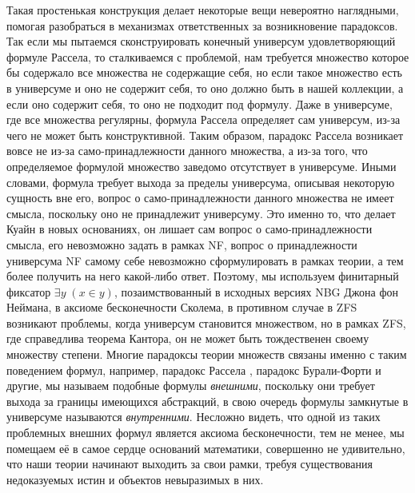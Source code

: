 \documentclass[12pt]{article}
\begin{document}
Такая простенькая конструкция делает некоторые вещи невероятно наглядными, помогая разобраться в механизмах ответственных за возникновение парадоксов. Так если мы пытаемся сконструировать конечный универсум удовлетворяющий формуле Рассела, то сталкиваемся с проблемой, нам требуется множество которое бы содержало все множества не содержащие себя, но если такое множество есть в универсуме и оно не содержит себя, то оно должно быть в нашей коллекции, а если оно содержит себя, то оно не подходит под формулу. Даже в универсуме, где все множества регулярны, формула Рассела определяет сам универсум, из-за чего не может быть конструктивной. Таким образом, парадокс Рассела возникает вовсе не из-за само-принадлежности данного множества, а из-за того, что определяемое формулой множество заведомо отсутствует в универсуме. Иными словами, формула требует выхода за пределы универсума, описывая некоторую сущность вне его, вопрос о само-принадлежности данного множества не имеет смысла, поскольку оно не принадлежит универсуму. Это именно то, что делает Куайн в новых основаниях, он лишает сам вопрос о само-принадлежности смысла, его невозможно задать в рамках NF, вопрос о принадлежности универсума NF самому себе невозможно сформулировать в рамках теории, а тем более получить на него какой-либо ответ. Поэтому, мы используем финитарный фиксатор $\exists y \; (x \in y)$, позаимствованный в исходных версиях NBG Джона фон Неймана, в аксиоме бесконечности Сколема, в противном случае в ZFS возникают проблемы, когда универсум становится множеством, но в рамках ZFS, где справедлива теорема Кантора, он не может быть тождественен своему множеству степени. Многие парадоксы теории множеств связаны именно с таким поведением формул, например, парадокс Рассела \cite{russell-paradox}, парадокс Бурали-Форти \cite{burali-forti} и другие, мы называем подобные формулы {\it внешними}, поскольку они требует выхода за границы имеющихся абстракций, в свою очередь формулы замкнутые в универсуме называются {\it внутренними}. Несложно видеть, что одной из таких проблемных внешних формул является аксиома бесконечности, тем не менее, мы помещаем её в самое сердце оснований математики, совершенно не удивительно, что наши теории начинают выходить за свои рамки, требуя существования недоказуемых истин и объектов невыразимых в них.
\end{document}
